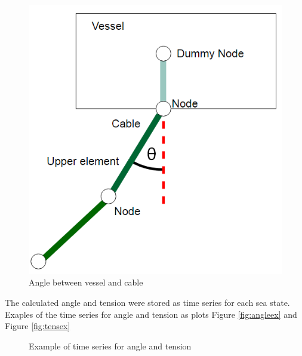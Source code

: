 \begin{figure}[H]
\centering
\includegraphics[scale=0.5]{figures/angle}
\caption[Angle between vessel and cable ]{Angle between vessel and cable  }
 \label{fig:angle}
\end{figure}

\noindent The calculated angle and tension were stored as time series for each sea state. Exaples of the time series for angle and tension as plots Figure \ref{fig:angleex} and Figure \ref{fig:tensex}

\begin{figure}[H]
\hfill
{}\hfill
\caption{Example of time series for angle and tension}
\label{fig:local1}
\end{figure}

